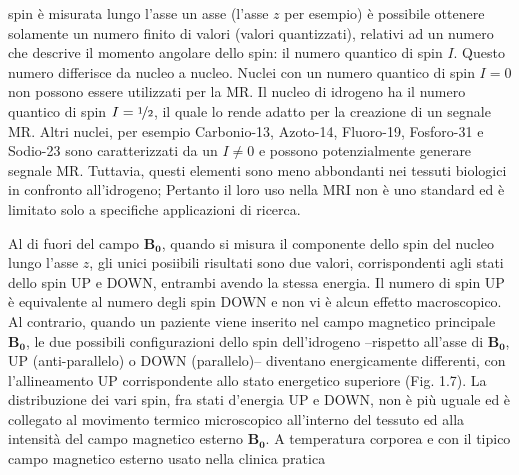 \documentclass[leqno,10pt,twocolumn,a4paper]{article}
\begin{document}
	spin è misurata lungo l'asse un asse (l'asse $z$ per esempio) è possibile ottenere solamente un numero finito di valori (valori quantizzati), relativi ad un numero che descrive il momento angolare dello spin: il numero 
	quantico di spin $I$. Questo numero differisce da nucleo a nucleo. Nuclei con un numero quantico di spin $I=0$ non possono essere utilizzati per la MR. Il nucleo di idrogeno ha il numero quantico di spin $I=\nicefrac{1}{2}$,
	il quale lo rende adatto per la creazione di un segnale MR. Altri nuclei, per esempio Carbonio-13, Azoto-14, Fluoro-19, Fosforo-31 e Sodio-23 sono caratterizzati da un $I\neq 0$ e possono potenzialmente generare 
	segnale MR. Tuttavia, questi elementi sono meno abbondanti nei tessuti biologici in confronto all'idrogeno; Pertanto il loro uso nella MRI non è uno standard ed è limitato solo a specifiche applicazioni di ricerca.
	\par Al di fuori del campo $\boldsymbol{B_0}$, quando si misura il componente dello spin del nucleo lungo l'asse $z$, gli unici posiibili risultati sono due valori, corrispondenti agli stati dello spin UP e DOWN, entrambi
	avendo la stessa energia. Il numero di spin UP è equivalente al numero degli spin DOWN e non vi è alcun effetto macroscopico. Al contrario, quando un paziente viene inserito nel campo magnetico principale $\boldsymbol{B_0}$,
	le due possibili configurazioni dello spin dell'idrogeno --rispetto all'asse di $\boldsymbol{B_0}$, UP (anti-parallelo) o DOWN (parallelo)-- diventano energicamente differenti, con l'allineamento UP corrispondente allo stato
	energetico superiore (Fig. 1.7). La distribuzione dei vari spin, fra stati d'energia UP e DOWN, non è più uguale ed è collegato al movimento termico microscopico all'interno del tessuto ed alla intensità del campo magnetico 
	esterno $\boldsymbol{B_0}$. A temperatura corporea e con il tipico campo magnetico esterno usato nella clinica pratica  
	
	
	
\end{document}
